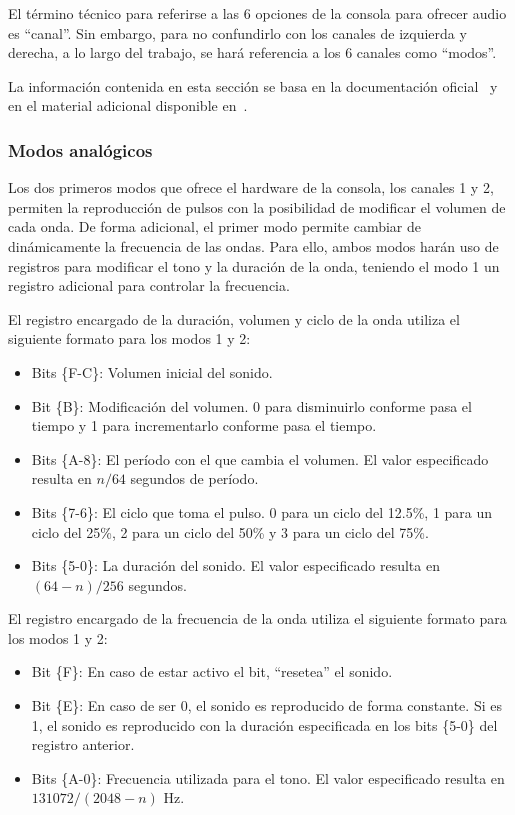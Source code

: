 El término técnico para referirse a las 6 opciones de la consola para ofrecer audio es ``canal''. Sin embargo, para no confundirlo con los canales de izquierda y derecha, a lo largo del trabajo, se hará referencia a los 6 canales como ``modos''.

La información contenida en esta sección se basa en la documentación oficial~\cite{bib:gba_manual} y en el material adicional disponible en~\cite{bib:belogic}.

\subsubsection{Modos analógicos}
Los dos primeros modos que ofrece el hardware de la consola, los canales 1 y 2, permiten la reproducción de pulsos con la posibilidad de modificar el volumen de cada onda. De forma adicional, el primer modo permite cambiar de dinámicamente la frecuencia de las ondas. Para ello, ambos modos harán uso de registros para modificar el tono y la duración de la onda, teniendo el modo 1 un registro adicional para controlar la frecuencia. 

El registro encargado de la duración, volumen y ciclo de la onda utiliza el siguiente formato para los modos 1 y 2:

\begin{itemize}
	\item Bits \{F-C\}: Volumen inicial del sonido.
	\item Bit \{B\}: Modificación del volumen. 0 para disminuirlo conforme pasa el tiempo y 1 para incrementarlo conforme pasa el tiempo. 
	\item Bits \{A-8\}: El período con el que cambia el volumen. El valor especificado resulta en $n/64$ segundos de período. 
	\item Bits \{7-6\}: El ciclo que toma el pulso. 0 para un ciclo del 12.5\%, 1 para un ciclo del 25\%, 2 para un ciclo del 50\% y 3 para un ciclo del 75\%.
	\item Bits \{5-0\}: La duración del sonido. El valor especificado resulta en $(64-n)/256$ segundos.
\end{itemize}

El registro encargado de la frecuencia de la onda utiliza el siguiente formato para los modos 1 y 2:

\begin{itemize}
	\item Bit \{F\}: En caso de estar activo el bit, ``resetea'' el sonido.
	\item Bit \{E\}: En caso de ser 0, el sonido es reproducido de forma constante. Si es 1, el sonido es reproducido con la duración especificada en los bits \{5-0\} del registro anterior.
	\item Bits \{A-0\}: Frecuencia utilizada para el tono. El valor especificado resulta en $131072/(2048-n)$ Hz.
\end{itemize}

